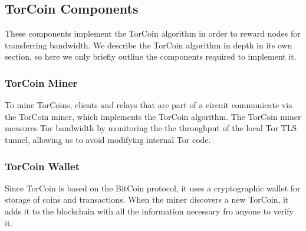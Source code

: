 \subsection{TorCoin Components} These components implement the TorCoin algorithm
in order to reward nodes for transferring bandwidth. We describe the TorCoin 
algorithm in depth in its own section, so here we only briefly outline the 
components required to implement it.

\subsubsection{TorCoin Miner} To mine TorCoins, clients and relays that are part
of a circuit communicate via the TorCoin miner, which implements the TorCoin
algorithm. The TorCoin miner measures Tor bandwidth by monitoring the the 
throughput of the local Tor TLS tunnel, allowing us to avoid modifying internal 
Tor code.

\subsubsection{TorCoin Wallet} Since TorCoin is based on the BitCoin protocol,
it uses a cryptographic wallet for storage of coins and transactions. When the
miner discovers a new TorCoin, it adds it to the blockchain with all the
information necessary fro anyone to verify it.
